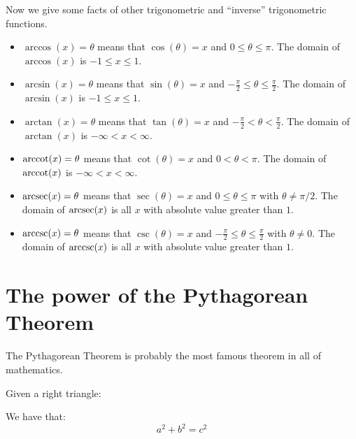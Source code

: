 \documentclass{ximera}
\begin{document}
Now we give some facts of other trigonometric and ``inverse''
trigonometric functions.

\begin{definition}\hfil
  \begin{itemize}
    \item $\arccos(x) = \theta$ means that $\cos(\theta) = x$ and
      $0\le \theta\le \pi$. The domain of $\arccos(x)$ is $-1\le x\le
      1$.
    \item $\arcsin(x) = \theta$ means that $\sin(\theta) = x$ and
      $-\frac{\pi}{2}\le \theta\le \frac{\pi}{2}$. The domain of
      $\arcsin(x)$ is $-1\le x\le 1$.
    \item $\arctan(x) = \theta$ means that $\tan(\theta) = x$ and
      $-\frac{\pi}{2}< \theta< \frac{\pi}{2}$. The domain of
      $\arctan(x)$ is $-\infty<x<\infty$.
    \item $\operatorname{arccot}(x) = \theta$ means that $\cot(\theta) = x$ and
      $0< \theta< \pi$. The domain of $\operatorname{arccot}(x)$ is
      $-\infty<x<\infty$.
    \item $\operatorname{arcsec}(x) = \theta$ means that $\sec(\theta) = x$ and
      $0\le \theta\le \pi$ with $\theta\ne \pi/2$. The domain of
      $\operatorname{arcsec}(x)$ is all $x$ with absolute value greater than $1$.
    \item $\operatorname{arccsc}(x) = \theta$ means that $\csc(\theta) = x$ and
      $-\frac{\pi}{2}\le \theta\le \frac{\pi}{2}$ with $\theta \ne 0$. The
      domain of $\operatorname{arccsc}(x)$ is all $x$ with absolute value greater
      than $1$.
  \end{itemize}
\end{definition}


\section{The power of the Pythagorean Theorem}

The Pythagorean Theorem is probably the most famous theorem in all of
mathematics.


\begin{theorem}
Given a right triangle:
\begin{image}
\end{image}
We have that:
\[
a^2 + b^2 = c^2
\]
\end{theorem}
\end{document}
